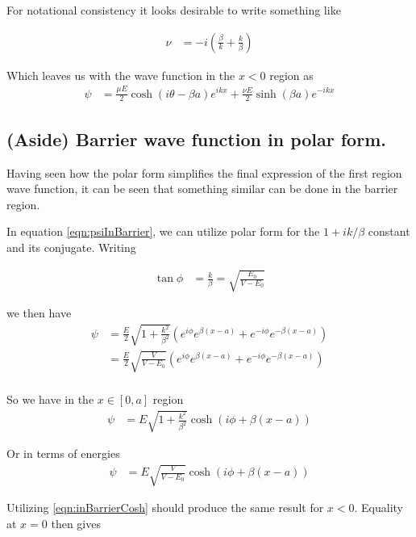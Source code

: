 \documentclass{article}
\begin{document}
For notational consistency it looks desirable to write something like

\begin{align}\label{eqn:nuDefined}
\nu &= -i \left(\frac{\beta}{k} + \frac{k}{\beta} \right) 
\end{align}

Which leaves us with the wave function in the $x<0$ region as
\begin{align}\label{eqn:incidentAndReflected}
\psi &=
\frac{\mu E}{2}\cosh\left( i\theta -\beta a \right) e^{ i k x }
+\frac{\nu E}{2}\sinh\left( \beta a \right) e^{ -i k x }
\end{align}

\subsection{ (Aside) Barrier wave function in polar form. }

Having seen how the polar form simplifies the final expression of the first region wave function, it can be seen that 
something similar can be done in the barrier region.  

In equation \ref{eqn:psiInBarrier}, we can utilize polar form for the $1+ik/\beta$ constant and its conjugate.  Writing

\begin{align}
\tan\phi &= \frac{k}{\beta} = \sqrt{\frac{E_0}{V-E_0}}
\end{align}

we then have
\begin{align*}
\psi 
&=
\frac{E}{2}\sqrt{1 + \frac{k^2}{\beta^2}} \left( e^{i\phi} e^{ \beta(x-a)} + e^{-i\phi} e^{ -\beta(x-a)} \right) \\
&=
\frac{E}{2}\sqrt{\frac{V}{V-E_0}} \left( e^{i\phi} e^{ \beta(x-a)} + e^{-i\phi} e^{ -\beta(x-a)} \right) \\
\end{align*}

So we have in the $x \in [0,a]$ region
\begin{align}\label{eqn:inBarrierCosh}
\psi &= E \sqrt{1 + \frac{k^2}{\beta^2}} \cosh\left( i\phi + \beta(x-a) \right) 
\end{align}

Or in terms of energies
\begin{align}
\psi &= E 
\sqrt{\frac{V}{V-E_0}}
\cosh\left( i\phi + \beta(x-a) \right) 
\end{align}

Utilizing 
\ref{eqn:inBarrierCosh}
should produce the same result for $x<0$.  Equality at $x=0$ then gives
\end{document}
